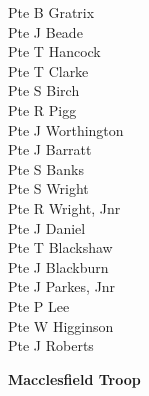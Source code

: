 \begin{multicols}{2}
  Pte B Gratrix \\
  Pte J Beade \\
  Pte T Hancock \\
  Pte T Clarke \\
  Pte S Birch \\
  Pte R Pigg \\
  Pte J Worthington \\
  Pte J Barratt \\
  Pte S Banks \\
  Pte S Wright \\
  Pte R Wright, Jnr \\
  Pte J Daniel \\
  Pte T Blackshaw \\
  Pte J Blackburn \\
  Pte J Parkes, Jnr \\
  Pte P Lee \\
  Pte W Higginson \\
  Pte J Roberts \\
\end{multicols}

\begin{center}
  \Large
  \textbf{Macclesfield Troop}
\end{center}

